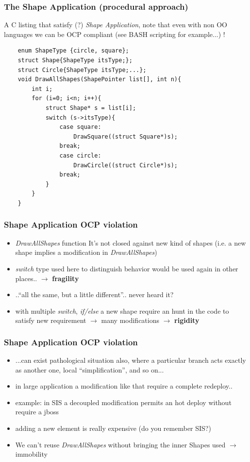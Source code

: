 \documentclass{beamer}
\begin{document}
\begin{frame}[containsverbatim]
	\frametitle{The Shape Application (procedural approach)}
	A C listing that satisfy (?) \textit{Shape Application}, note that even with non OO languages we can be OCP compliant (see BASH scripting for example...) ! \\
	\begin{lstlisting}
	enum ShapeType {circle, square};
	struct Shape{ShapeType itsType;};
	struct Circle{ShapeType itsType;...};
	void DrawAllShapes(ShapePointer list[], int n){
		int i;
		for (i=0; i<n; i++){
			struct Shape* s = list[i];
			switch (s->itsType){
				case square:
					DrawSquare((struct Square*)s);
				break;
				case circle:
					DrawCircle((struct Circle*)s);
				break;
			}
		}
	}
	\end{lstlisting}
\end{frame}

\begin{frame}
  \frametitle{Shape Application OCP violation}
  \begin{itemize}
	\item<+-> \textit{DrawAllShapes} function It's not closed against new kind of shapes (i.e. a new shape implies a modification in \textit{DrawAllShapes})
	\item<+-> \textit{switch} type used here to distinguish behavior would be used again in other places.. $ \rightarrow $ \textbf{fragility}
	\item<+-> ..``all the same, but a little different''.. never heard it?
	\item<+-> with multiple \textit{switch}, \textit{if/else} a new shape require an hunt in the code to satisfy new requirement $ \rightarrow $ many modifications $ \rightarrow $ \textbf{rigidity}
   \end{itemize}
\end{frame}

\begin{frame}
  \frametitle{Shape Application OCP violation}
  \begin{itemize}
	\item<+-> ...can exist pathological situation also, where a particular branch acts exactly as another one, local ``simplification'', and so on...
	\item<+-> in large application a modification like that require a complete redeploy..
	\item<+-> example: in SIS a decoupled modification permits an hot deploy without require a jboss
	\item<+-> adding a new element is really expensive (do you remember SIS?)
	\item<+-> We can't reuse \textit{DrawAllShapes} without bringing the inner Shapes used $ \rightarrow $ immobility
   \end{itemize}
\end{frame}
\end{document}
